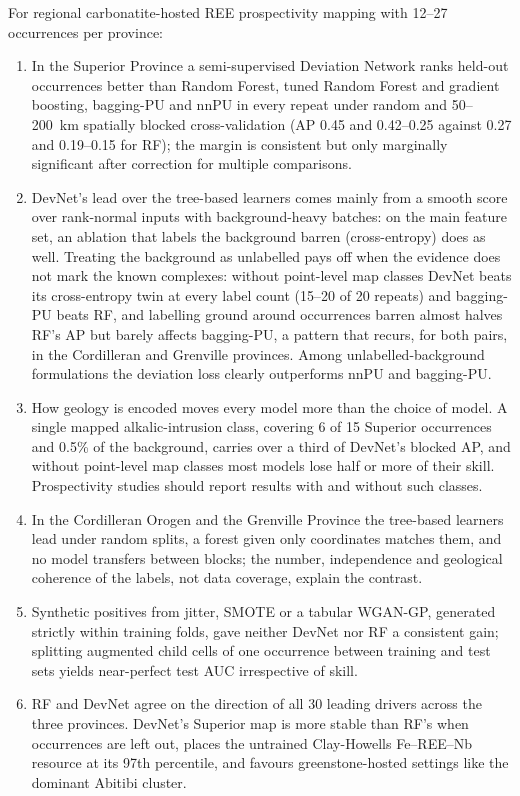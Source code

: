 \documentclass[pdflatex,sn-apa]{sn-jnl}
\begin{document}
For regional carbonatite-hosted REE prospectivity mapping with 12--27 occurrences per province:
\begin{enumerate}
\item In the Superior Province a semi-supervised Deviation Network ranks held-out occurrences better than Random Forest, tuned Random Forest and gradient boosting, bagging-PU and nnPU in every repeat under random and 50--200~km spatially blocked cross-validation (AP 0.45 and 0.42--0.25 against 0.27 and 0.19--0.15 for RF); the margin is consistent but only marginally significant after correction for multiple comparisons.
\item DevNet's lead over the tree-based learners comes mainly from a smooth score over rank-normal inputs with background-heavy batches: on the main feature set, an ablation that labels the background barren (cross-entropy) does as well. Treating the background as unlabelled pays off when the evidence does not mark the known complexes: without point-level map classes DevNet beats its cross-entropy twin at every label count (15--20 of 20 repeats) and bagging-PU beats RF, and labelling ground around occurrences barren almost halves RF's AP but barely affects bagging-PU, a pattern that recurs, for both pairs, in the Cordilleran and Grenville provinces. Among unlabelled-background formulations the deviation loss clearly outperforms nnPU and bagging-PU.
\item How geology is encoded moves every model more than the choice of model. A single mapped alkalic-intrusion class, covering 6 of 15 Superior occurrences and 0.5\% of the background, carries over a third of DevNet's blocked AP, and without point-level map classes most models lose half or more of their skill. Prospectivity studies should report results with and without such classes.
\item In the Cordilleran Orogen and the Grenville Province the tree-based learners lead under random splits, a forest given only coordinates matches them, and no model transfers between blocks; the number, independence and geological coherence of the labels, not data coverage, explain the contrast.
\item Synthetic positives from jitter, SMOTE or a tabular WGAN-GP, generated strictly within training folds, gave neither DevNet nor RF a consistent gain; splitting augmented child cells of one occurrence between training and test sets yields near-perfect test AUC irrespective of skill.
\item RF and DevNet agree on the direction of all 30 leading drivers across the three provinces. DevNet's Superior map is more stable than RF's when occurrences are left out, places the untrained Clay-Howells Fe--REE--Nb resource at its 97th percentile, and favours greenstone-hosted settings like the dominant Abitibi cluster.
\end{enumerate}
\end{document}
